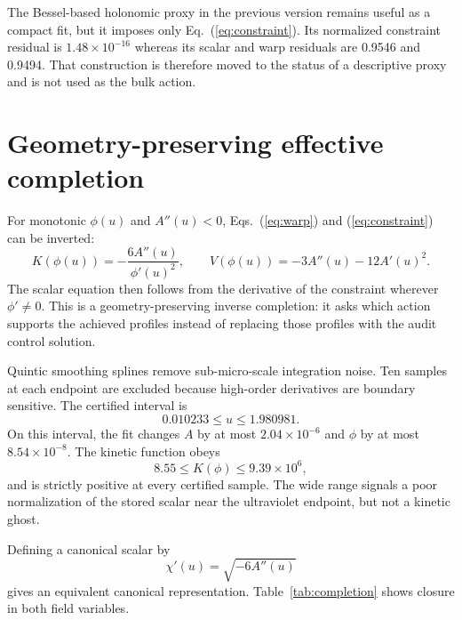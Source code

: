 \documentclass[10pt]{article}
\begin{document}
The Bessel-based holonomic proxy in the previous version remains useful as a
compact fit, but it imposes only Eq.~(\ref{eq:constraint}).  Its normalized
constraint residual is $1.48\times10^{-16}$ whereas its scalar and warp
residuals are 0.9546 and 0.9494.  That construction is therefore moved to the
status of a descriptive proxy and is not used as the bulk action.

\section{Geometry-preserving effective completion}
\label{sec:effective}

For monotonic $\phi(u)$ and $A''(u)<0$, Eqs.~(\ref{eq:warp}) and
(\ref{eq:constraint}) can be inverted:
\begin{equation}
 K(\phi(u))=-\frac{6A''(u)}{\phi'(u)^2},\qquad
 V(\phi(u))=-3A''(u)-12A'(u)^2.
 \label{eq:inverse}
\end{equation}
The scalar equation then follows from the derivative of the constraint wherever
$\phi'\neq0$.  This is a geometry-preserving inverse completion: it asks which
action supports the achieved profiles instead of replacing those profiles with
the audit control solution.

Quintic smoothing splines remove sub-micro-scale integration noise.  Ten
samples at each endpoint are excluded because high-order derivatives are
boundary sensitive.  The certified interval is
\begin{equation}
 0.010233\leq u\leq1.980981.
\end{equation}
On this interval, the fit changes $A$ by at most $2.04\times10^{-6}$ and
$\phi$ by at most
$8.54\times10^{-8}$.  The kinetic function obeys
\begin{equation}
 8.55\leq K(\phi)\leq9.39\times10^6,
\end{equation}
and is strictly positive at every certified sample.  The wide range signals a
poor normalization of the stored scalar near the ultraviolet endpoint, but not
a kinetic ghost.

Defining a canonical scalar by
\begin{equation}
 \chi'(u)=\sqrt{-6A''(u)}
 \label{eq:canonicalfield}
\end{equation}
gives an equivalent canonical representation.  Table~\ref{tab:completion}
shows closure in both field variables.
\end{document}
